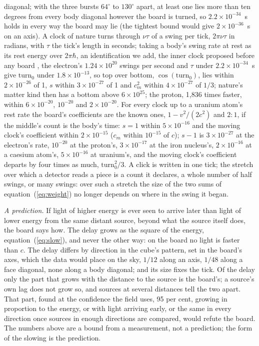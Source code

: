 \documentclass[pdflatex,sn-mathphys-num]{sn-jnl}
\begin{document}
diagonal; with the three bursts $64^\circ$ to $130^\circ$ apart, at least one lies more than ten degrees from every body diagonal however the board is turned, so $2.2 \times 10^{-34}$~s holds in every way the board may lie (the tightest bound would give $2 \times 10^{-36}$~s on an axis). A clock of nature turns through $\nu\tau$ of a swing per tick, $2\pi\nu\tau$ in radians, with $\tau$ the tick's length in seconds; taking a body's swing rate at rest as its rest energy over $2\pi\hbar$, an identification we add, the inner clock proposed before any board \cite{debroglie1925}, the electron's $1.24 \times 10^{20}$ swings per second and $\tau$ under $2.2 \times 10^{-34}$~s give $\mathrm{turn}_0$ under $1.8 \times 10^{-13}$, so top over bottom, $\cos(\mathrm{turn}_0)$, lies within $2 \times 10^{-26}$ of 1, $s$ within $3 \times 10^{-27}$ of 1 and $c_m^2$ within $4 \times 10^{-27}$ of $1/3$; nature's matter kind then has a bottom above $6 \times 10^{25}$; the proton, 1,836 times faster, within $6 \times 10^{-20}$, $10^{-20}$ and $2 \times 10^{-20}$. For every clock up to a uranium atom's rest rate the board's coefficients are the known ones, $1 - v^2/(2c^2)$ and $2 : 1$, if the middle's count is the body's time: $s = 1$ within $5 \times 10^{-16}$ and the moving clock's coefficient within $2 \times 10^{-15}$ ($c_m$ within $10^{-15}$ of $c$); $s - 1$ is $3 \times 10^{-27}$ at the electron's rate, $10^{-20}$ at the proton's, $3 \times 10^{-17}$ at the iron nucleus's, $2 \times 10^{-16}$ at a caesium atom's, $5 \times 10^{-16}$ at uranium's, and the moving clock's coefficient departs by four times as much, $\mathrm{turn}_0^2/3$. A click is written in one tick; the stretch over which a detector reads a piece is a count it declares, a whole number of half swings, or many swings: over such a stretch the size of the two sums of equation~(\ref{eq:weight}) no longer depends on where in the swing it began.

\begin{framed}\noindent\textit{A prediction.} If light of higher energy is ever seen to arrive later than light of lower energy from the same distant source, beyond what the source itself does, the board says how. The delay grows as the square of the energy, equation~(\ref{eq:slow}), and never the other way: on the board no light is faster than $c$. The delay differs by direction in the cube's pattern, set in the board's axes, which the data would place on the sky, $1/12$ along an axis, $1/48$ along a face diagonal, none along a body diagonal; and its size fixes the tick. Of the delay only the part that grows with the distance to the source is the board's; a source's own lag does not grow so, and sources at several distances tell the two apart. That part, found at the confidence the field uses, 95 per cent, growing in proportion to the energy, or with light arriving early, or the same in every direction once sources in enough directions are compared, would refute the board. The numbers above are a bound from a measurement, not a prediction; the form of the slowing is the prediction.\end{framed}
\end{document}

